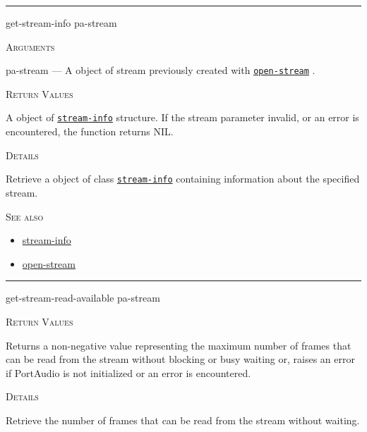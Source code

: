 \documentclass[a4paper]{report}
\begin{document}
  

    \rule{\linewidth}{0.1mm}
    
    \label{portaudio__fun__get-stream-info}
    \begin{defun}[Function]
    get-stream-info pa-stream


    
    \bigskip
    \textsc{Arguments}

pa-stream
	--- A object of stream previously created with \hyperref[portaudio__fun__open-stream]{\texttt{open-stream}}
  .




    
    \bigskip
    \textsc{Return Values}

A object of \hyperref[portaudio__class__stream-info]{\texttt{stream-info}}
   structure. If the stream parameter invalid, or an error is encountered, the function returns NIL.


	
    \bigskip
    \textsc{Details}

Retrieve a object of class \hyperref[portaudio__class__stream-info]{\texttt{stream-info}}
   containing information about the specified stream.






      
    \bigskip
    \textsc{See also}


	
    \begin{itemize}
    
	  
    \item
    \hyperref[portaudio__class__stream-info]{stream-info}
    
    \item
    \hyperref[portaudio__fun__open-stream]{open-stream}
    
	
    \end{itemize}
  
      


    
    \end{defun}
  
  

    \rule{\linewidth}{0.1mm}
    
    \label{portaudio__fun__get-stream-read-available}
    \begin{defun}[Function]
    get-stream-read-available pa-stream


    
    \bigskip
    \textsc{Return Values}


Returns a non-negative value representing the maximum number of frames that can be read from the stream without blocking or busy waiting or, raises an error if PortAudio is not initialized or an error is encountered.


	
    \bigskip
    \textsc{Details}

Retrieve the number of frames that can be read from the stream without waiting.




    
    \end{defun}
  
\end{document}
